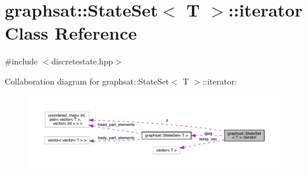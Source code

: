 \hypertarget{classgraphsat_1_1_state_set_1_1iterator}{}\section{graphsat\+::State\+Set$<$ T $>$\+::iterator Class Reference}
\label{classgraphsat_1_1_state_set_1_1iterator}


{\ttfamily \#include $<$discretestate.\+hpp$>$}



Collaboration diagram for graphsat\+::State\+Set$<$ T $>$\+::iterator\+:
\nopagebreak
\begin{figure}[H]
\begin{center}
\leavevmode
\includegraphics[width=350pt]{classgraphsat_1_1_state_set_1_1iterator__coll__graph}
\end{center}
\end{figure}

